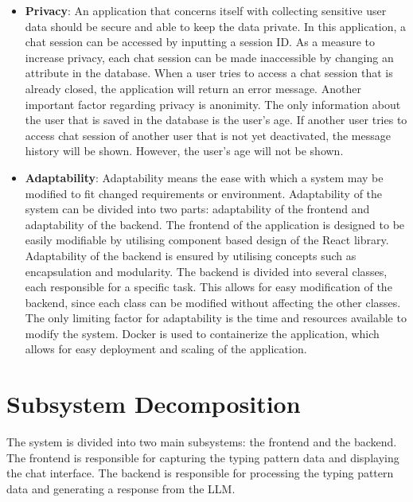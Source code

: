 \begin{itemize}
    \item \textbf{Privacy}: 
    An application that concerns itself with collecting sensitive user data should be secure and able to keep the data private.
    In this application, a chat session can be accessed by inputting a session ID.
    As a measure to increase privacy, each chat session can be made inaccessible by changing an attribute in the database.
    When a user tries to access a chat session that is already closed, the application will return an error message.
    Another important factor regarding privacy is anonimity.
    The only information about the user that is saved in the database is the user's age.
    If another user tries to access chat session of another user that is not yet deactivated, the message history will be shown.
    However, the user's age will not be shown.

    \item \textbf{Adaptability}: 
    Adaptability means the ease with which a system may be modified to fit changed requirements or environment.
    Adaptability of the system can be divided into two parts: adaptability of the frontend and adaptability of the backend.
    The frontend of the application is designed to be easily modifiable by utilising component based design of the React library.
    Adaptability of the backend is ensured by utilising concepts such as encapsulation and modularity.
    The backend is divided into several classes, each responsible for a specific task.
    This allows for easy modification of the backend, since each class can be modified without affecting the other classes.
    The only limiting factor for adaptability is the time and resources available to modify the system.
    Docker is used to containerize the application, which allows for easy deployment and scaling of the application.

\end{itemize}
    

\section{Subsystem Decomposition}


The system is divided into two main subsystems: the frontend and the backend.
The frontend is responsible for capturing the typing pattern data and displaying the chat interface.
The backend is responsible for processing the typing pattern data and generating a response from the \ac{LLM}.

